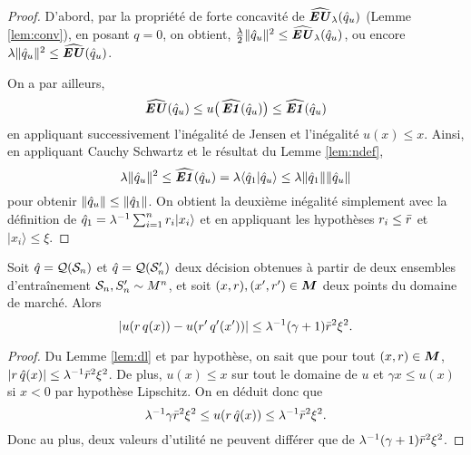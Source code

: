 \begin{proof}
  D'abord, par la propriété de forte concavité de $\hEU_\lambda(\qh_u)$ (Lemme \ref{lem:conv}),
  en posant $q=0$, on obtient, $\frac{\lambda}{2}\|\qh_u\|^2 \leq \hEU_\lambda(\qh_u)$, ou encore
  $\lambda\|\qh_u\|^2 \leq \hEU(\qh_u)$.

  On a par ailleurs,
  \begin{equation}
    \hEU(\qh_u) \leq u\big(\hEN(\qh_u)\big) \leq \hEN(\qh_u)
  \end{equation}
  en appliquant successivement l'inégalité de Jensen et l'inégalité $u(x) \leq x$. Ainsi, en
  appliquant Cauchy Schwartz et le résultat du Lemme \ref{lem:ndef},
  \begin{equation}
    \lambda\|\qh_u\|^2 \leq \hEN(\qh_u) =  \lambda\langle\qh_1|\qh_u\rangle \leq \lambda\|\qh_1\|\|\qh_u\|
  \end{equation}
  pour obtenir $\|\qh_u\| \leq \|\qh_1\|$. On obtient la deuxième inégalité simplement avec
  la définition de $\qh_1 = \lambda^{-1}\sumi r_i|x_i\rangle$ et en appliquant les hypothèses
  $r_i\leq\rmax$ et $|x_i\rangle \leq \xi$.
\end{proof}

\begin{lemme}
  \label{lem:domu}
  Soit $\qh = \alg(\S_n)$ et $\qh = \alg(\S_n')$ deux décision obtenues à partir de deux
  ensembles d'entraînement $\S_n,S_n' \sim M^n$, et soit $(x,r),(x',r') \in \M$ deux points du
  domaine de marché. Alors
  \begin{equation}
    |u(r\,q(x)) - u(r'\,q'(x'))| \leq \lambda^{-1}(\gamma+1)\rmax^2\xi^2.
  \end{equation}
\end{lemme}

\begin{proof}
  Du Lemme \ref{lem:dl} et par hypothèse, on sait que pour tout $(x,r) \in \M$,
  $|r\,\qh(x)| \leq \lambda^{-1}\rmax^2\xi^2$. De plus, $u(x)\leq x$ sur tout le domaine de
  $u$ et $\gamma x \leq u(x)$ si $x<0$ par hypothèse Lipschitz. On en déduit donc que
  \begin{equation}
    \lambda^{-1}\gamma\rmax^2\xi^2 \leq u(r\,\qh(x)) \leq \lambda^{-1}\rmax^2\xi^2.
  \end{equation}
  Donc au plus, deux valeurs d'utilité ne peuvent différer que de $\lambda^{-1}(\gamma+1)\rmax^2\xi^2$.
\end{proof}

